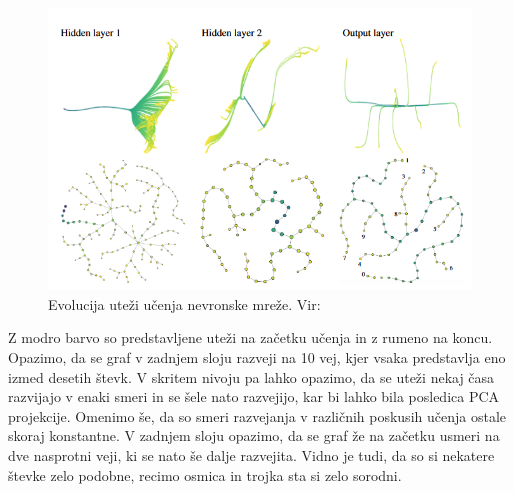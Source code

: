 \begin{figure}[H]
    \centering
    \includegraphics[width=1\linewidth]{resources/mapper-minst.png}
    \caption{Evolucija uteži učenja nevronske mreže. Vir: \cite{Gabella_2021}}
    \label{fig:backprop}
\end{figure}
Z modro barvo so predstavljene uteži na začetku učenja in z rumeno na koncu. Opazimo, da se graf v zadnjem sloju razveji na 10 vej, kjer vsaka predstavlja eno izmed desetih števk. V skritem nivoju pa lahko opazimo, da se uteži nekaj časa razvijajo v enaki smeri in se šele nato razvejijo, kar bi lahko bila posledica PCA projekcije. Omenimo še, da so smeri razvejanja v različnih poskusih učenja ostale skoraj konstantne. V zadnjem sloju opazimo, da se graf že na začetku usmeri na dve nasprotni veji, ki se nato še dalje razvejita. Vidno je tudi, da so si nekatere števke zelo podobne, recimo osmica in trojka sta si zelo sorodni.
